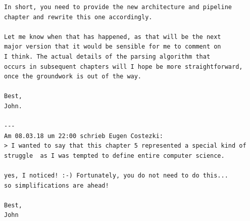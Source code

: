 \begin{Verbatim}
In short, you need to provide the new architecture and pipeline
chapter and rewrite this one accordingly.

Let me know when that has happened, as that will be the next
major version that it would be sensible for me to comment on
I think. The actual details of the parsing algorithm that
occurs in subsequent chapters will I hope be more straightforward,
once the groundwork is out of the way.

Best,
John.

---
Am 08.03.18 um 22:00 schrieb Eugen Costezki:
> I wanted to say that this chapter 5 represented a special kind of struggle  as I was tempted to define entire computer science.

yes, I noticed! :-) Fortunately, you do not need to do this...
so simplifications are ahead!

Best,
John

\end{Verbatim}